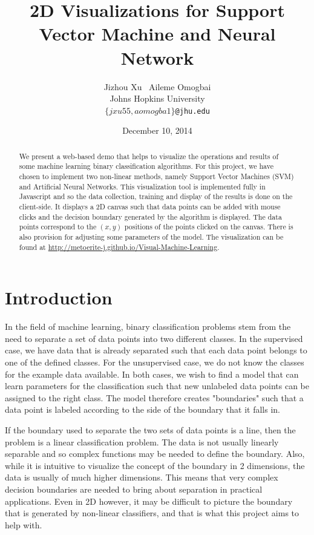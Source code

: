 \documentclass[11pt,letterpaper]{article}
\title{2D Visualizations for Support Vector Machine and Neural Network}
\author{Jizhou Xu \, Aileme Omogbai \\
	Johns Hopkins University \\
	{\tt $\{jxu55, aomogba1\}$@jhu.edu}}
\date{December 10, 2014}
\begin{document}
\maketitle
\begin{abstract}
We present a web-based demo that helps to visualize the operations and results of some machine learning binary classification algorithms. For this project, we have chosen to implement two non-linear methods, namely Support Vector Machines (SVM) and Artificial Neural Networks. This visualization tool is implemented fully in Javascript and so the data collection,  training  and display of the results is done on the client-side. It displays a 2D canvas such that data points can be added with mouse clicks and the decision boundary generated by the algorithm is displayed. The data points correspond to the $(x,y)$ positions of the points clicked on the canvas. There is also provision for adjusting some parameters of the model. The visualization can be found at \url{http://metoerite-j.github.io/Visual-Machine-Learning}.
\end{abstract}

\section{Introduction}

In the field of machine learning, binary classification problems stem from the need to separate a set of data points into two different classes. In the supervised case, we have data that is already separated such that each data point belongs to one of the defined classes. For the unsupervised case, we do not know the classes for the example data available. In both cases, we wish to find a model that can learn parameters for the classification such that new unlabeled data points can be assigned to the right class. The model therefore creates "boundaries" such that a data point is labeled according to the side of the boundary that it falls in. 

If the boundary used to separate the two sets of data points is a line, then the problem is a linear classification problem. The data is not usually linearly separable and so complex functions may be needed to define the boundary. Also, while it is intuitive to visualize the concept of the boundary in 2 dimensions, the data is usually of much higher dimensions. This means that very complex decision boundaries are needed to bring about separation in practical applications. Even in 2D however, it may be difficult to picture the boundary that is generated by non-linear classifiers, and that is what this project aims to help with.
\end{document}
